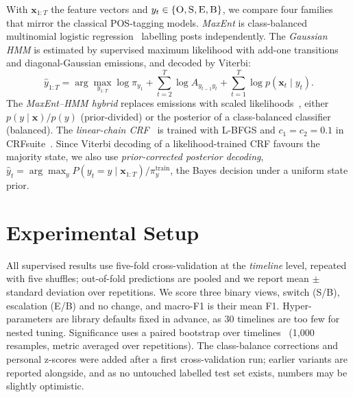 \documentclass[conference]{IEEEtran}
\newcommand{\state}[1]{\textsc{#1}}
\begin{document}
With $\mathbf{x}_{1:T}$ the feature vectors and $y_t \in \{\state{O},\state{S},\state{E},\state{B}\}$, we compare four families that mirror the classical POS-tagging models. \emph{MaxEnt} is class-balanced multinomial logistic regression~\cite{berger1996maximum} labelling posts independently. The \emph{Gaussian HMM} is estimated by supervised maximum likelihood with add-one transitions and diagonal-Gaussian emissions, and decoded by Viterbi:
\begin{equation}
\hat{y}_{1:T} = \arg\max_{y_{1:T}} \log \pi_{y_1} + \sum_{t=2}^{T} \log A_{y_{t-1} y_t} + \sum_{t=1}^{T} \log p(\mathbf{x}_t \mid y_t).
\end{equation}
The \emph{MaxEnt--HMM hybrid} replaces emissions with scaled likelihoods~\cite{bourlard1994connectionist}, either $p(y \mid \mathbf{x})/p(y)$ (prior-divided) or the posterior of a class-balanced classifier (balanced). The \emph{linear-chain CRF}~\cite{lafferty2001conditional} is trained with L-BFGS and $c_1 = c_2 = 0.1$ in CRFsuite~\cite{okazaki2007crfsuite}. Since Viterbi decoding of a likelihood-trained CRF favours the majority state, we also use \emph{prior-corrected posterior decoding}, $\hat{y}_t = \arg\max_y P(y_t = y \mid \mathbf{x}_{1:T}) / \pi^{\text{train}}_y$, the Bayes decision under a uniform state prior.

\section{Experimental Setup}

All supervised results use five-fold cross-validation at the \emph{timeline} level, repeated with five shuffles; out-of-fold predictions are pooled and we report mean $\pm$ standard deviation over repetitions. We score three binary views, switch (\state{S}/\state{B}), escalation (\state{E}/\state{B}) and no change, and macro-F1 is their mean F1. Hyper-parameters are library defaults fixed in advance, as 30 timelines are too few for nested tuning. Significance uses a paired bootstrap over timelines~\cite{bergkirkpatrick2012empirical} (1,000 resamples, metric averaged over repetitions). The class-balance corrections and personal z-scores were added after a first cross-validation run; earlier variants are reported alongside, and as no untouched labelled test set exists, numbers may be slightly optimistic.

\end{document}
